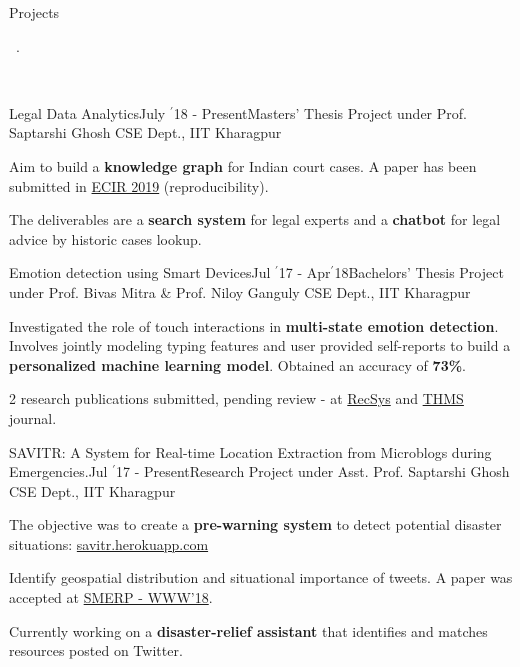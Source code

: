 \documentclass[11pt, a4paper]{resume}
\newcommand{\important}[1]{
  \textcolor{mypurple}{#1}
}
\newcommand{\fillit}[1]{
  \leavevmode\xleaders\hbox{#1}\hfill\kern0pt
}
\newcommand{\sectionSubtitleX}[1]{
  \begin{large}
    \important{#1}
    \end{large}
    \fillit{\important{.}}
}
\begin{document}
\sectionSubtitleX{Projects}
\\
\begin{rSubsection}{Legal Data Analytics}{July $^{\prime}$18 - Present}{Masters' Thesis Project under Prof. Saptarshi Ghosh}{\hspace*{\fill} CSE Dept., IIT Kharagpur}
\item Aim to build a {\bf knowledge graph} for Indian court cases. A paper has been submitted in \href{http://ecir2019.org/}{ECIR 2019} (reproducibility). 
\item The deliverables are a {\bf search system} for legal experts and a {\bf chatbot} for legal advice by historic cases lookup.
\end{rSubsection}

\begin{rSubsection}{Emotion detection using Smart Devices}{Jul $^{\prime}$17 - Apr$^{\prime}$18}{Bachelors' Thesis Project under Prof. Bivas Mitra \& Prof. Niloy Ganguly}{\hspace*{\fill} CSE Dept., IIT Kharagpur}
\item Investigated the role of touch interactions in {\bf multi-state emotion detection}. Involves jointly modeling typing features and  user provided self-reports to build a {\bf personalized machine learning model}. Obtained an accuracy of {\bf 73\%}.
\item 2 research publications submitted, pending review - at \href{https://recsys.acm.org/recsys18/}{RecSys} and \href{http://www.ieeesmc.org/publications/transactions-on-human-machine-systems}{THMS} journal.
\end{rSubsection}

\begin{rSubsection}{SAVITR: A System for Real-time Location Extraction from Microblogs during Emergencies.}{Jul $^{\prime}$17 - Present}{Research Project under Asst. Prof. Saptarshi Ghosh}{\hspace*{\fill} CSE Dept., IIT Kharagpur}
\item The objective was to create a {\bf pre-warning system} to detect potential disaster situations: \href{http://savitr.herokuapp.com}{savitr.herokuapp.com}
\item Identify geospatial distribution and situational importance of tweets. A paper was accepted at \href{https://www.cse.iitk.ac.in/users/kripa/smerp2018/}{SMERP - WWW'18}.
\item Currently working on a {\bf disaster-relief assistant} that identifies and matches resources posted on Twitter.
\end{rSubsection}
\end{document}
